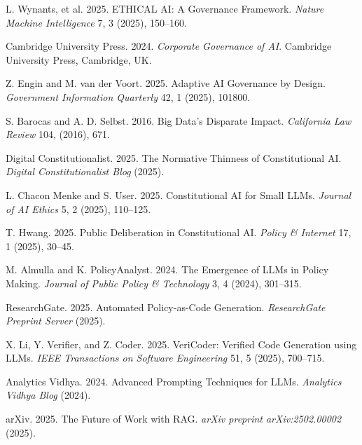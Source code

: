 \documentclass[manuscript,screen,review,anonymous,9pt]{acmart}
\begin{document}
\begin{thebibliography}{99}
L. Wynants, et al. 2025.
\newblock ETHICAL AI: A Governance Framework.
\newblock \emph{Nature Machine Intelligence} 7, 3 (2025), 150--160.

Cambridge University Press. 2024.
\newblock \emph{Corporate Governance of AI}.
\newblock Cambridge University Press, Cambridge, UK.

Z. Engin and M. van der Voort. 2025.
\newblock Adaptive AI Governance by Design.
\newblock \emph{Government Information Quarterly} 42, 1 (2025), 101800.

S. Barocas and A. D. Selbst. 2016.
\newblock Big Data's Disparate Impact.
\newblock \emph{California Law Review} 104, (2016), 671.

Digital Constitutionalist. 2025.
\newblock The Normative Thinness of Constitutional AI.
\newblock \emph{Digital Constitutionalist Blog} (2025).

L. Chacon Menke and S. User. 2025.
\newblock Constitutional AI for Small LLMs.
\newblock \emph{Journal of AI Ethics} 5, 2 (2025), 110--125.

T. Hwang. 2025.
\newblock Public Deliberation in Constitutional AI.
\newblock \emph{Policy \& Internet} 17, 1 (2025), 30--45.

M. Almulla and K. PolicyAnalyst. 2024.
\newblock The Emergence of LLMs in Policy Making.
\newblock \emph{Journal of Public Policy \& Technology} 3, 4 (2024), 301--315.

ResearchGate. 2025.
\newblock Automated Policy-as-Code Generation.
\newblock \emph{ResearchGate Preprint Server} (2025).

X. Li, Y. Verifier, and Z. Coder. 2025.
\newblock VeriCoder: Verified Code Generation using LLMs.
\newblock \emph{IEEE Transactions on Software Engineering} 51, 5 (2025), 700--715.

Analytics Vidhya. 2024.
\newblock Advanced Prompting Techniques for LLMs.
\newblock \emph{Analytics Vidhya Blog} (2024).

arXiv. 2025.
\newblock The Future of Work with RAG.
\newblock \emph{arXiv preprint arXiv:2502.00002} (2025).


\end{thebibliography}
\end{document}
